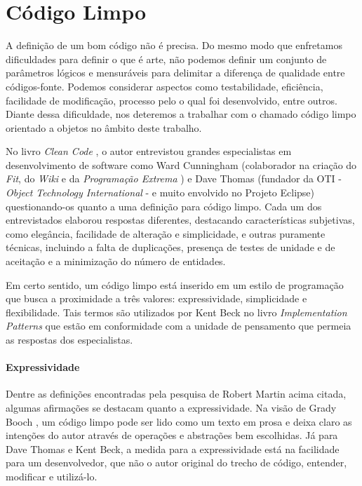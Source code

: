 \chapter{Código Limpo}
\label{chap:codigo_limpo}

A definição de um bom código não é precisa. Do mesmo modo que enfretamos dificuldades para definir o que é arte, não podemos definir um conjunto 
de parâmetros lógicos e mensuráveis para delimitar a diferença de qualidade entre códigos-fonte. Podemos considerar aspectos como testabilidade, 
eficiência, facilidade de modificação, processo pelo o qual foi desenvolvido, entre outros. Diante dessa dificuldade, nos deteremos a trabalhar 
com o chamado código limpo orientado a objetos no âmbito deste trabalho.

No livro \textit{Clean Code} \citep{Martin2008}, o autor entrevistou grandes especialistas em desenvolvimento de software como Ward Cunningham 
(colaborador na criação do \textit{Fit}, do \textit{Wiki} e da \textit{Programação Extrema} \citep{Beck1999}) e Dave Thomas (fundador da OTI - 
\textit{Object Technology International} - e muito envolvido no Projeto Eclipse) questionando-os quanto a uma definição para código limpo. Cada um 
dos entrevistados elaborou respostas diferentes, destacando características subjetivas, como elegância, facilidade de alteração e simplicidade, e 
outras puramente técnicas, incluindo a falta de duplicações, presença de testes de unidade e de aceitação e a minimização do número de entidades.

Em certo sentido, um código limpo está inserido em um estilo de programação que busca a proximidade a três valores: expressividade, 
simplicidade e flexibilidade. Tais termos são utilizados por Kent Beck no livro \textit{Implementation Patterns} \citep{Beck2007} que estão em
conformidade com a unidade de pensamento que permeia as respostas dos especialistas.

\subsubsection{Expressividade}
Dentre as definições encontradas pela pesquisa de Robert Martin acima citada, algumas afirmações se destacam quanto a expressividade. Na visão de Grady Booch \citep{Booch2007}, um código limpo pode ser lido como um texto em prosa e deixa claro as intenções do autor através de operações e abstrações bem escolhidas. Já para Dave Thomas e Kent Beck, a medida para a expressividade está na facilidade para um desenvolvedor, que não o autor original do trecho de código, entender, modificar e utilizá-lo.

